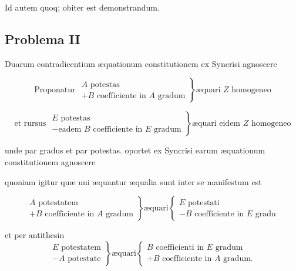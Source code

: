 \documentclass[11pt,a4paper]{article}
\begin{document}
Id autem quoq; obiter est demonstrandum.

\subsection*{Problema II}

Duarum contradicentium æquationum constitutionem ex Syncrisi agnoscere

\[ \text{Proponatur } \left.\begin{array}{l} A \text{ potestas} \\ + B \text{ coefficiente in } A \text{ gradum} \end{array}\right\} \text{æquari } Z \text{ homogeneo} \]

\[ \text{et rursus } \left.\begin{array}{l} E \text{ potestas} \\ - \text{eadem } B \text{ coefficiente in } E \text{ gradum} \end{array}\right\} \text{æquari eidem } Z \text{ homogeneo} \]

unde par \ill{} gradus et par potestas. oportet ex Syncrisi earum æquationum constitutionem agnoscere

quoniam igitur quæ uni æquantur æqualia sunt inter se manifestum est

\[ \left.\begin{array}{l} A \text{ potestatem} \\ + B \text{ coefficiente in } A \text{ gradum} \end{array}\right\} \text{æquari} \left\{\begin{array}{l} E \text{ potestati} \\ - B \text{ coefficiente in } E \text{ gradu} \end{array}\right. \]

et per antithesin
\[ \left.\begin{array}{l} E \text{ potestatem} \\ - A \text{ potestate} \end{array}\right\} \text{æquari} \left\{\begin{array}{l} B \text{ coefficienti in } E \text{ gradum} \\ + B \text{ coefficiente in } A \text{ gradum.} \end{array}\right. \]
\end{document}
